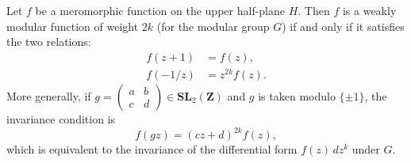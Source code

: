 Let $f$ be a meromorphic function on the upper half-plane $H$. Then $f$ is a weakly modular function of weight $2k$ (for the modular group $G$) if and only if it satisfies the two relations:
\begin{align}
f(z+1) &= f(z), \\
f(-1/z) &= z^{2k} f(z).
\end{align}
More generally, if $g = \begin{pmatrix} a & b \\ c & d \end{pmatrix} \in \mathbf{SL}_2(\mathbf{Z})$ and $g$ is taken modulo $\{\pm 1\}$, the invariance condition is
$$f(gz) = (cz+d)^{2k} f(z),$$
which is equivalent to the invariance of the differential form $f(z)\,dz^k$ under $G$.

